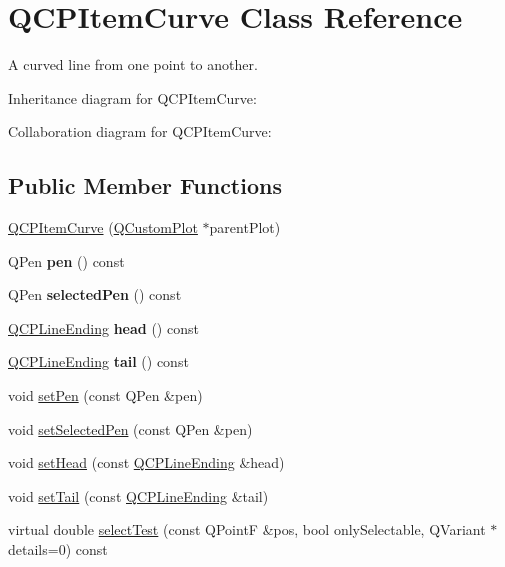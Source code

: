 \hypertarget{class_q_c_p_item_curve}{}\section{Q\+C\+P\+Item\+Curve Class Reference}
\label{class_q_c_p_item_curve}


A curved line from one point to another.  




Inheritance diagram for Q\+C\+P\+Item\+Curve\+:


Collaboration diagram for Q\+C\+P\+Item\+Curve\+:
\subsection*{Public Member Functions}
\begin{DoxyCompactItemize}
\item 
\hyperlink{class_q_c_p_item_curve_ac9b7508bb5c8827e1a7a6199f8c82bec}{Q\+C\+P\+Item\+Curve} (\hyperlink{class_q_custom_plot}{Q\+Custom\+Plot} $\ast$parent\+Plot)
\item 
Q\+Pen {\bfseries pen} () const \hypertarget{class_q_c_p_item_curve_abc6321e55a9ba1a0c7df407843dfa252}{}\label{class_q_c_p_item_curve_abc6321e55a9ba1a0c7df407843dfa252}

\item 
Q\+Pen {\bfseries selected\+Pen} () const \hypertarget{class_q_c_p_item_curve_abd8b8be5b13bc4dafec4c1758c281336}{}\label{class_q_c_p_item_curve_abd8b8be5b13bc4dafec4c1758c281336}

\item 
\hyperlink{class_q_c_p_line_ending}{Q\+C\+P\+Line\+Ending} {\bfseries head} () const \hypertarget{class_q_c_p_item_curve_afc067f0d1e60cd04812f2c2c7fdf36c3}{}\label{class_q_c_p_item_curve_afc067f0d1e60cd04812f2c2c7fdf36c3}

\item 
\hyperlink{class_q_c_p_line_ending}{Q\+C\+P\+Line\+Ending} {\bfseries tail} () const \hypertarget{class_q_c_p_item_curve_a9adddfcc5275be0cf27e3c0c31c37c1a}{}\label{class_q_c_p_item_curve_a9adddfcc5275be0cf27e3c0c31c37c1a}

\item 
void \hyperlink{class_q_c_p_item_curve_a034be908440aec785c34b92843461221}{set\+Pen} (const Q\+Pen \&pen)
\item 
void \hyperlink{class_q_c_p_item_curve_a375b917669f868c5a106bf2f1ab7c26d}{set\+Selected\+Pen} (const Q\+Pen \&pen)
\item 
void \hyperlink{class_q_c_p_item_curve_a08a30d9cdd63995deea3d9e20430676f}{set\+Head} (const \hyperlink{class_q_c_p_line_ending}{Q\+C\+P\+Line\+Ending} \&head)
\item 
void \hyperlink{class_q_c_p_item_curve_ac3488d8b1a6489c845dc5bff3ef71124}{set\+Tail} (const \hyperlink{class_q_c_p_line_ending}{Q\+C\+P\+Line\+Ending} \&tail)
\item 
virtual double \hyperlink{class_q_c_p_item_curve_a741375c11667b5f9c95b2683f93ee514}{select\+Test} (const Q\+PointF \&pos, bool only\+Selectable, Q\+Variant $\ast$details=0) const 
\end{DoxyCompactItemize}
